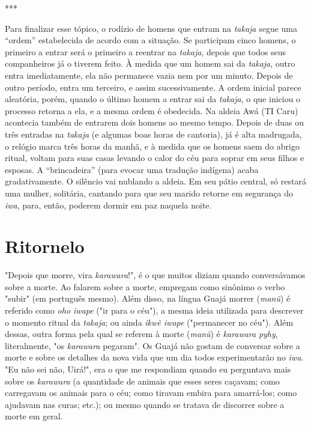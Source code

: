 ***

Para finalizar esse tópico, o rodízio de homens que entram na
\emph{takaja} segue uma ``ordem'' estabelecida de acordo com a situação.
Se participam cinco homens, o primeiro a entrar será o primeiro a
reentrar na \emph{takaja}, depois que todos seus companheiros já o
tiverem feito. À medida que um homem sai da \emph{takaja}, outro entra
imediatamente, ela não permanece vazia nem por um minuto. Depois de
outro período, entra um terceiro, e assim sucessivamente. A ordem
inicial parece aleatória, porém, quando o último homem a entrar sai da
\emph{takaja}, o que iniciou o processo retorna a ela, e a mesma ordem é
obedecida. Na aldeia Awá (TI Caru) acontecia também de entrarem dois
homens ao mesmo tempo. Depois de duas ou três entradas na \emph{takaja}
(e algumas boas horas de cantoria), já é alta madrugada, o relógio marca
três horas da manhã, e à medida que os homens saem do abrigo ritual,
voltam para suas casas levando o calor do céu para soprar em seus filhos
e esposas. A ``brincadeira'' (para evocar uma tradução indígena) acaba
gradativamente. O silêncio vai nublando a aldeia. Em seu pátio central,
só restará uma mulher, solitária, cantando para que seu marido retorne
em segurança do \emph{iwa}, para, então, poderem dormir em paz naquela
noite.

\section{Ritornelo}\label{ritornelo}

"Depois que morre, vira \emph{karawara}!", é o que muitos diziam quando
conversávamos sobre a morte. Ao falarem sobre a morte, empregam como
sinônimo o verbo "subir" (em português mesmo). Além disso, na língua
Guajá morrer (\emph{manũ}) é referido como \emph{oho iwape} ("ir para o
céu"), a mesma ideia utilizada para descrever o momento ritual da
\emph{takaja}; ou ainda \emph{ikwẽ iwape} ("permanecer no céu"). Além
dessas, outra forma pela qual se referem à morte (\emph{manũ}) é
\emph{karawara} \emph{pyhy}, literalmente, "os \emph{karawara} pegaram".
Os Guajá não gostam de conversar sobre a morte e sobre os detalhes da
nova vida que um dia todos experimentarão no \emph{iwa}. "Eu não sei
não, Uirá!", era o que me respondiam quando eu perguntava mais sobre os
\emph{karawara} (a quantidade de animais que esses seres caçavam; como
carregavam os animais para o céu; como tiravam embira para amarrá-los;
como ajudavam nas curas; etc.); ou mesmo quando se tratava de discorrer
sobre a morte em geral.


